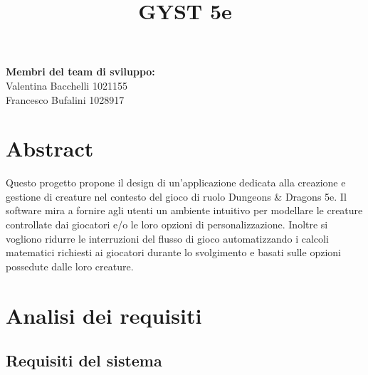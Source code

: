 \documentclass[a4paper, 11pt]{article}
\title{GYST 5e}
\date{}
\author{}
\begin{document}
\setlength{\parskip}{6pt}
\setlength{\parindent}{12pt}
\maketitle

\begin{flushright}
\textbf{Membri del team di sviluppo:}
\\Valentina Bacchelli 1021155
\\Francesco Bufalini 1028917
\end{flushright}

\renewcommand\contentsname{Sommario}

\newpage
\tableofcontents



\newpage
\section{Abstract}
Questo progetto propone il design di un'applicazione dedicata alla creazione e gestione di creature nel contesto del gioco di ruolo Dungeons \& Dragons 5e. Il software mira a fornire agli utenti un ambiente intuitivo per modellare le creature controllate dai giocatori e/o le loro opzioni di personalizzazione.
Inoltre si vogliono ridurre le interruzioni del flusso di gioco automatizzando i calcoli matematici richiesti ai giocatori durante lo svolgimento e basati sulle opzioni possedute dalle loro creature. 



\newpage
\section{Analisi dei requisiti}
\subsection{Requisiti del sistema}
\end{document}
